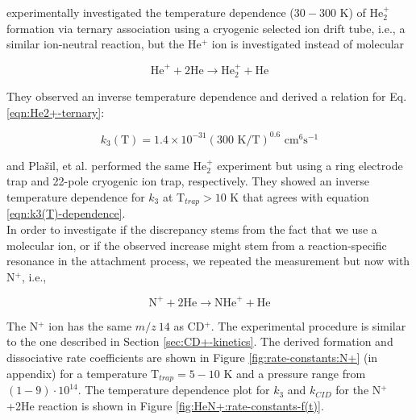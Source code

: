 \citet{bohringer_temperature_1983} experimentally investigated the temperature dependence ($30-300$ K) of He$_2^+$ 
formation via ternary association using a cryogenic selected ion drift tube, i.e., a similar ion-neutral reaction, but 
the He$^+$ ion is investigated instead of molecular \CD

\begin{equation}
    \text{He}^+ + 2\text{He} \rightarrow \text{He}_2^+ + \text{He}
    \label{eqn:He2+-ternary}
\end{equation}

They observed an inverse temperature dependence and derived a relation for Eq.
\ref{eqn:He2+-ternary}:

\begin{equation}
    k_3 (\text{T}) = 1.4 \times 10^{-31} (300 \text{ K} / \text{T})^{0.6} \text{ cm}^6\text{s}^{-1}
    \label{eqn:k3(T)-dependence}
\end{equation}

\citet{gerlich_experimental_1993} and Pla\v{s}il, et al. \cite{plasil_stabilization_2012} performed the same He$_2^+$ experiment but using a ring electrode trap and 22-pole cryogenic ion trap, respectively. They showed an inverse temperature dependence for $k_3$ at T$_{trap}>10$ K that agrees with equation \ref{eqn:k3(T)-dependence}.\\

In order to investigate if the discrepancy stems from the fact that we use a
molecular ion, or if the observed increase might stem from a reaction-specific
resonance in the attachment process, we repeated the measurement but now with
N$^+$, i.e.,

\[ \text{N}^+ + 2\text{He} \rightarrow \text{NHe}^+ + \text{He}\]

The N$^+$ ion has the same $m/z\ 14$ as CD$^+$. The experimental procedure is
similar to the one described in Section \ref{sec:CD+-kinetics}. The derived
formation and dissociative rate coefficients are shown in Figure
\ref{fig:rate-constants:N+} (in appendix) for a temperature T$_{trap}=5-10$ K
and a pressure range from $(1 - 9 ) \cdot 10^{14}$\percc. The temperature
dependence plot for $k_3$ and $k_{CID}$ for the N$^+$+2He reaction is shown in
Figure \ref{fig:HeN+:rate-constants-f(t)}.

